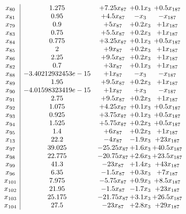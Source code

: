\documentclass[11pt]{article}
\begin{document}
\[\begin{array}{c| c c@{\hskip 2pt} c@{\hskip 2pt} c@{\hskip 2pt} }
 x_{80}   &  1.275 & + 7.25 x_{87} & + 0.1 x_{3} & + 0.5 x_{187}\\
 x_{81}   &  0.95 & + 4.5 x_{87} & - x_{3} & - x_{187}\\
 x_{79}   &  0.9 & + 5 x_{87} & + 0.2 x_{3} & + 1 x_{187}\\
 x_{83}   &  0.75 & + 5.5 x_{87} & + 0.2 x_{3} & + 1 x_{187}\\
 x_{84}   &  0.775 & + 3.25 x_{87} & + 0.1 x_{3} & + 0.5 x_{187}\\
 x_{85}   &  2 & + 9 x_{87} & + 0.2 x_{3} & + 1 x_{187}\\
 x_{86}   &  2.25 & + 9.5 x_{87} & + 0.2 x_{3} & + 1 x_{187}\\
 x_{82}   &  0.7 & + 3 x_{87} & + 0.1 x_{3} & + 1 x_{187}\\
 x_{88}   &  -3.40212932453e-15 & + 1 x_{87} & - x_{3} & - x_{187}\\
 x_{89}   &  1.95 & + 9.5 x_{87} & + 0.2 x_{3} & + 1 x_{187}\\
 x_{90}   &  -4.01598323419e-15 & + 1 x_{87} & +  x_{3} & - x_{187}\\
 x_{91}   &  2.75 & + 9.5 x_{87} & + 0.2 x_{3} & + 1 x_{187}\\
 x_{92}   &  1.075 & + 4.25 x_{87} & + 0.1 x_{3} & + 0.5 x_{187}\\
 x_{93}   &  0.925 & + 3.75 x_{87} & + 0.1 x_{3} & + 0.5 x_{187}\\
 x_{94}   &  1.525 & + 5.75 x_{87} & + 0.2 x_{3} & + 0.5 x_{187}\\
 x_{95}   &  1.4 & + 6 x_{87} & + 0.2 x_{3} & + 1 x_{187}\\
 x_{13}   &  22.2 & -4 x_{87} & -1.9 x_{3} & + 23 x_{187}\\
 x_{97}   &  39.025 & -25.25 x_{87} & + 1.6 x_{3} & + 40.5 x_{187}\\
 x_{98}   &  22.775 & -20.75 x_{87} & + 2.6 x_{3} & + 23.5 x_{187}\\
 x_{99}   &  41.3 & -23 x_{87} & + 1.4 x_{3} & + 43 x_{187}\\
 x_{96}   &  6.35 & -1.5 x_{87} & + 0.3 x_{3} & + 7 x_{187}\\
 x_{101}   &  7.975 & -5.75 x_{87} & + 0.9 x_{3} & + 8.5 x_{187}\\
 x_{102}   &  21.95 & -1.5 x_{87} & -1.7 x_{3} & + 23 x_{187}\\
 x_{103}   &  25.175 & -21.75 x_{87} & + 3.1 x_{3} & + 26.5 x_{187}\\
 x_{104}   &  27.5 & -23 x_{87} & + 2.8 x_{3} & + 29 x_{187}\\

\end{array}\]
\end{document}
